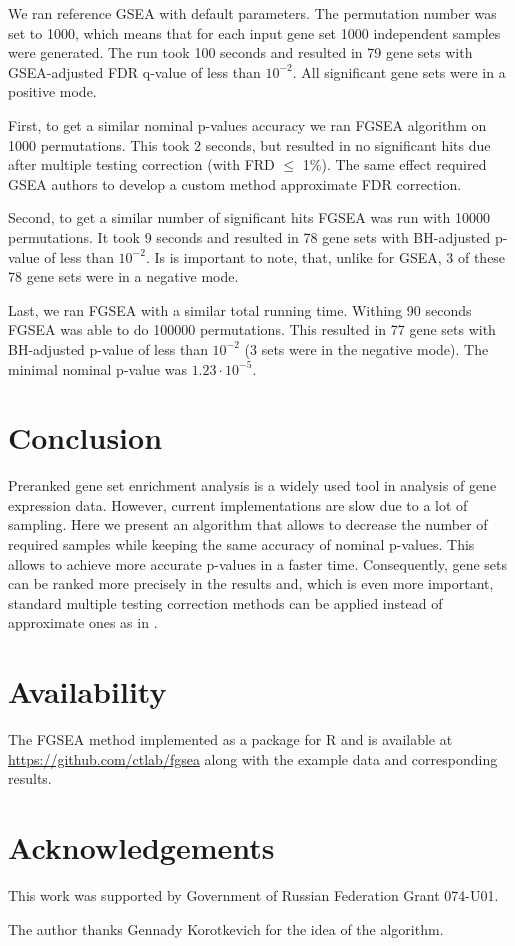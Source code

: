\documentclass[runningheads,a4paper]{llncs}
\begin{document}
We ran reference GSEA with default parameters. The permutation number 
was set to 1000, which means that for each input gene set 1000 independent
samples were generated. The run took 100 seconds and resulted
in 79 gene sets with GSEA-adjusted FDR q-value of less than $10^{-2}$. All
significant gene sets were in a positive mode.

First, to get a similar nominal p-values accuracy we ran FGSEA algorithm on
1000 permutations. This took 2 seconds, but resulted
in no significant hits due after multiple testing correction (with FRD $\le$ 1\%). The same
effect required GSEA authors to develop a custom method approximate FDR correction.

Second, to get a similar number of significant hits FGSEA
was run with 10000 permutations.
It took 9 seconds and resulted in 
78 gene sets with BH-adjusted p-value of less than $10^{-2}$. Is is important
to note, that, unlike for GSEA, 3 of these 78 gene sets were in a negative mode.

Last, we ran FGSEA with a similar total running time. Withing 90 seconds
FGSEA was able to do 100000 permutations. This resulted in
77 gene sets with BH-adjusted p-value of less than $10^{-2}$ (3 sets
were in the negative mode). The minimal nominal p-value was $1.23\cdot10^{-5}$. 

\section{Conclusion}

Preranked gene set enrichment analysis is a widely used tool in analysis of
gene expression data. However, current implementations are slow due to 
a lot of sampling. Here we present an algorithm that allows to decrease
the number of required samples while keeping the same accuracy 
of nominal p-values. This allows to achieve more accurate p-values
in a faster time. Consequently, gene sets can be ranked more
precisely in the results and, which is even more important, 
standard multiple testing
correction methods can be applied instead of approximate ones
as in \cite{Subramanian2005}. 

\section*{Availability}\label{secion_availability}

The FGSEA method implemented as a package for R and is available at 
\url{https://github.com/ctlab/fgsea} along with the example data
and corresponding results.

\section*{Acknowledgements}\label{secion_acknowledgements}

This work was supported by Government of Russian Federation Grant 074-U01.

The author thanks Gennady Korotkevich for the idea of the algorithm.

{}

\end{document}
